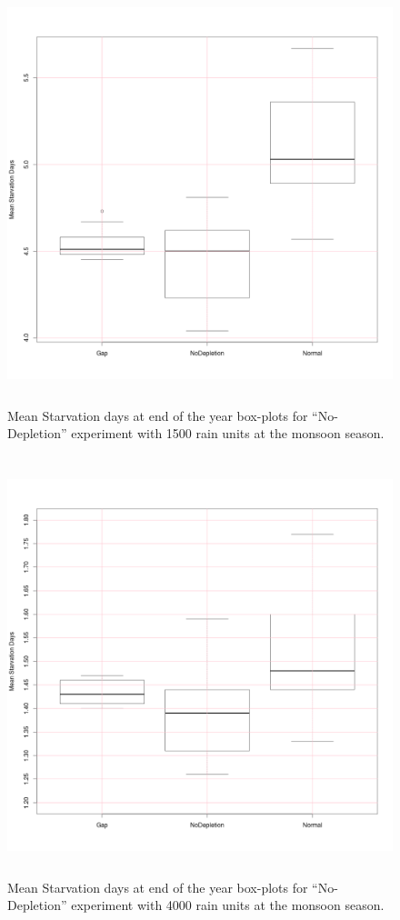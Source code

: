 \documentclass[11pt,oneside,a4paper,openright]{report}
\begin{document}
\begin{figure}[!htb]
\centering
\includegraphics[height=12.2cm]{figures/expm/gapBoxplotsClimate1500}
\caption{Mean Starvation days at end of the year box-plots for ``No-Depletion'' experiment 
with 1500 rain units at the monsoon season.}
\label{fig:gapBoxplotsClimate1500}
\end{figure}


\begin{figure}[!htb]
\centering
\includegraphics[height=12.2cm]{figures/expm/gapBoxplotsClimate4000}
\caption{Mean Starvation days at end of the year box-plots for ``No-Depletion'' experiment 
with 4000 rain units at the monsoon season.}
\label{fig:gapBoxplotsClimate4000}
\end{figure}
\end{document}

